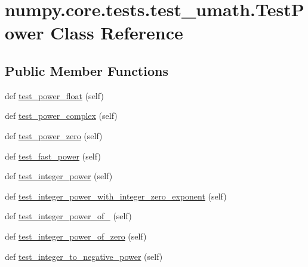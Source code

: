 \hypertarget{classnumpy_1_1core_1_1tests_1_1test__umath_1_1TestPower}{}\section{numpy.\+core.\+tests.\+test\+\_\+umath.\+Test\+Power Class Reference}
\label{classnumpy_1_1core_1_1tests_1_1test__umath_1_1TestPower}
\subsection*{Public Member Functions}
\begin{DoxyCompactItemize}
\item 
def \hyperlink{classnumpy_1_1core_1_1tests_1_1test__umath_1_1TestPower_aff0227c0db29749f4af9a50c1c2d9b6a}{test\+\_\+power\+\_\+float} (self)
\item 
def \hyperlink{classnumpy_1_1core_1_1tests_1_1test__umath_1_1TestPower_ab957bc4514b2acd4592831046f930fa0}{test\+\_\+power\+\_\+complex} (self)
\item 
def \hyperlink{classnumpy_1_1core_1_1tests_1_1test__umath_1_1TestPower_a6e62cfb6179e5f9fb6d8f43fd6db0e66}{test\+\_\+power\+\_\+zero} (self)
\item 
def \hyperlink{classnumpy_1_1core_1_1tests_1_1test__umath_1_1TestPower_a514a3c9948e5b934f04af4720d331d7d}{test\+\_\+fast\+\_\+power} (self)
\item 
def \hyperlink{classnumpy_1_1core_1_1tests_1_1test__umath_1_1TestPower_a0d59d93bd2aba17adc7f0d7ee42c11ee}{test\+\_\+integer\+\_\+power} (self)
\item 
def \hyperlink{classnumpy_1_1core_1_1tests_1_1test__umath_1_1TestPower_a7c5c5c7710eeae9916356d022c182772}{test\+\_\+integer\+\_\+power\+\_\+with\+\_\+integer\+\_\+zero\+\_\+exponent} (self)
\item 
def \hyperlink{classnumpy_1_1core_1_1tests_1_1test__umath_1_1TestPower_a7b6eba205b27ba8c5ecf582440cbd647}{test\+\_\+integer\+\_\+power\+\_\+of\+\_} (self)
\item 
def \hyperlink{classnumpy_1_1core_1_1tests_1_1test__umath_1_1TestPower_aecb027729d1042f915eff6f66df47dc0}{test\+\_\+integer\+\_\+power\+\_\+of\+\_\+zero} (self)
\item 
def \hyperlink{classnumpy_1_1core_1_1tests_1_1test__umath_1_1TestPower_a3e2a609d4ecfe67749c4f14ee975b90d}{test\+\_\+integer\+\_\+to\+\_\+negative\+\_\+power} (self)
\end{DoxyCompactItemize}


